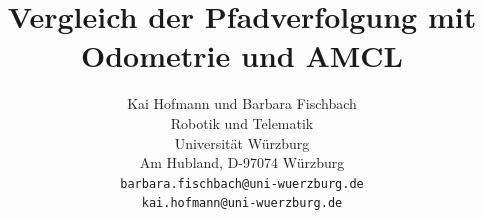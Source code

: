 \documentclass[11pt,a4paper]{article}
\begin{document}
\sloppy

\title{\Large\bf Vergleich der Pfadverfolgung mit Odometrie und AMCL }

\author{Kai Hofmann und Barbara Fischbach\\
  Robotik und Telematik \\
  Universit\"at W\"urzburg\\
  Am Hubland, D-97074 W\"urzburg\\
{\small \texttt{barbara.fischbach@uni-wuerzburg.de}}\\
{\small \texttt{kai.hofmann@uni-wuerzburg.de}}}

\date{}




\maketitle

\newpage

\tableofcontents{}

\newpage

\twocolumn
\end{document}

